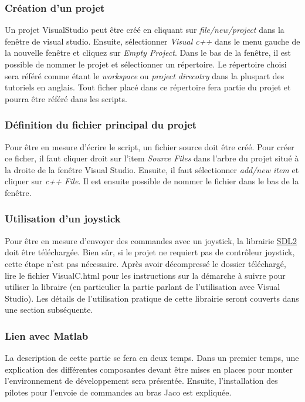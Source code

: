 \documentclass[root.tex]{subfiles}
\begin{document}
\subsubsection{Création d'un projet}
Un projet VisualStudio peut être créé en cliquant sur \textit{file/new/project} dans la fenêtre de visual studio.
Ensuite, sélectionner \textit{Visual c++} dans le menu gauche de la nouvelle fenêtre et cliquez sur \textit{Empty Project}.
Dans le bas de la fenêtre, il est possible de nommer le projet et sélectionner un répertoire.
Le répertoire choisi sera référé comme étant le \textit{workspace} ou \textit{project direcotry} dans la pluspart des tutoriels en anglais.
Tout ficher placé dans ce répertoire fera partie du projet et pourra être référé dans les scripts.

\subsubsection{Définition du fichier principal du projet}
Pour être en mesure d'écrire le script, un fichier source doit être créé.
Pour créer ce ficher, il faut cliquer droit sur l'item \textit{Source Files} dans l'arbre du projet situé à la droite de la fenêtre Visual Studio.
Ensuite, il faut sélectionner \textit{add/new item} et cliquer sur \textit{c++ File}.
Il est ensuite possible de nommer le fichier dans le bas de la fenêtre.

\subsubsection{Utilisation d'un joystick}
Pour être en mesure d'envoyer des commandes avec un joystick, la librairie \href{https://www.libsdl.org/release/SDL2-2.0.7.zip
}{SDL2} doit être téléchargée.
Bien sûr, si le projet ne requiert pas de contrôleur joystick, cette étape n'est pas nécessaire.
Après avoir décompressé le dossier téléchargé, lire le fichier VisualC.html pour les instructions sur la démarche à suivre pour utiliser la libraire (en particulier la partie parlant de l'utilisation avec Visual Studio).
Les détails de l'utilisation pratique de cette librairie seront couverts dans une section subséquente.

\subsubsection{Lien avec Matlab}

La description de cette partie se fera en deux temps.
Dans un premier temps, une explication des différentes composantes devant être mises en places pour monter l'environnement de développement sera présentée.
Ensuite, l'installation des pilotes pour l'envoie de commandes au bras Jaco est expliquée.
\end{document}
